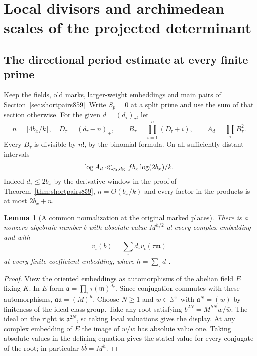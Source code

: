\documentclass[a4paper,11pt]{article}
\newtheorem{lemma}[proposition]{Lemma}
\theoremstyle{definition}
\theoremstyle{remark}
\numberwithin{equation}{section}
\begin{document}
\section{Local divisors and archimedean scales of the projected determinant}\label{nav:terminal-determinants}

\subsection{The directional period estimate at every finite prime}
\label{sec:allprimetable862}
Keep the fields, old marks, larger-weight embeddings and main
pairs of Section~\ref{sec:shortpairs859}. Write \(S_p=0\) at a
split prime and use the sum of that section otherwise. For the
given \(d=(d_\tau)_\tau\), let
\[
 n=\lceil4b_x/k\rceil,\quad D_\tau=(d_\tau-n)_+,\qquad
 B_\tau=\prod_{i=1}^n(D_\tau+i),\qquad A_d=\prod_\tau B_\tau^2.
\]
Every \(B_\tau\) is divisible by \(n!\), by the binomial formula.
On all sufficiently distant intervals
\[
         \log A_d\ll_{q_0,d_{\rm K}} f b_x\log(2b_x)/k .
\]
Indeed \(d_\tau\le2b_x\) by the derivative window in the proof
of Theorem~\ref{thm:shortpairs859}, \(n=O(b_x/k)\) and every
factor in the products is at most \(2b_x+n\).

\begin{lemma}[A common normalization at the original marked places]
\leavevmode\label{lem:idealscale862}
There is a nonzero algebraic number \(b\) with absolute value
\(M^{h/2}\) at every complex embedding and with
\[
         v_\iota(b)=\sum_\tau d_\tau v_\iota(\tau\mathfrak m)
\]
at every finite coefficient embedding, where \(h=\sum_\tau d_\tau\).
\end{lemma}
\begin{proof}
View the oriented embeddings as automorphisms of the abelian
field \(E\) fixing \(K\). In \(E\) form
\(\mathfrak a=\prod_\tau\tau(\mathfrak m)^{d_\tau}\).
Since conjugation commutes with these automorphisms,
\(\mathfrak a\bar{\mathfrak a}=(M)^h\). Choose \(N\ge1\)
and \(w\in E^\times\) with \(\mathfrak a^N=(w)\) by
finiteness of the ideal class group. Take any root satisfying
\(b^{2N}=M^{hN}w/\bar w\). The ideal on the right is
\(\mathfrak a^{2N}\), so taking local valuations gives the
display. At any complex embedding of \(E\) the image of
\(w/\bar w\) has absolute value one. Taking absolute values
in the defining equation gives the stated value for every
conjugate of the root; in particular \(b\bar b=M^h\).
\end{proof}
\end{document}
